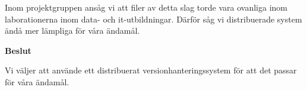 Inom projektgruppen ansåg vi att filer av detta slag torde vara ovanliga inom laborationerna inom data- och it-utbildningar. Därför såg vi  distribuerade system ändå mer lämpliga för våra ändamål.
\begin{flushright}
  
  \textbf{Beslut}
  
  Vi väljer att använde ett distribuerat versionhanteringssystem för att det passar för våra ändamål.
  
\end{flushright}


